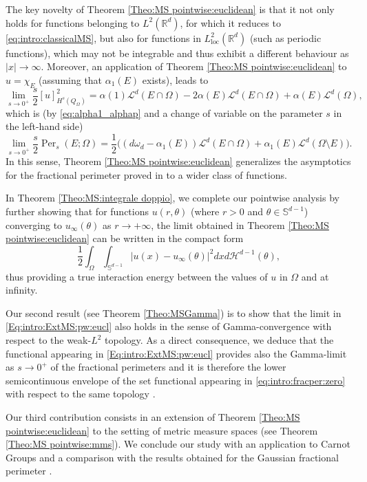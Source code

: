 \documentclass[reqno,11pt]{amsart}
\numberwithin{equation}{section}
\theoremstyle{definition} %
\theoremstyle{plain}
\theoremstyle{definition}
\theoremstyle{remark}
\def\elle#1{L^{#1}}
\def\Sd{{\mathbb{S}^{d-1}}}
\def\Haus{{\mathcal{H}^{d-1}}}
\def\Qom{{Q_\Omega}}
\def\O{\Omega}
\def\io{\int_\Omega}
\def\L{\mathcal{L}}
\def\R{\mathbb{R}}
\newcommand{\abs}[1]{\left|#1\right|}
\begin{document}
{The key novelty of Theorem \ref{Theo:MS pointwise:euclidean} is that it not only holds for functions belonging to $\elle2(\R^d)$, for which it reduces to \eqref{eq:intro:classicalMS}, but also for functions in $\elle2_{\textrm{loc}}(\R^d)$ (such as periodic functions), which may not be integrable and thus exhibit a different behaviour as $|x|\to \infty$. 
Moreover, an application of Theorem \ref{Theo:MS pointwise:euclidean} to $u=\chi_E$ (assuming that $\alpha_1(E)$ exists), leads to
\[
\lim_{s\to 0^+}\frac{s}{2}[u]^2_{H^s(\Qom)}=\alpha(1)\L^d(E\cap\O)-2\alpha(E)\L^d(E\cap\O)+\alpha(E)\L^d(\O),
\]
which is (by \eqref{eq:alpha1_alphap} and a change of variable on the parameter $s$ in the left-hand side)
\begin{equation}
    \label{eq:intro:fracper:zero}
    \lim_{s\to 0^+}\frac s2\operatorname{Per}_s(E;\Omega)=\frac12\bigg((d\omega_d-\alpha_1(E))\L^d(E\cap\O)+\alpha_1(E)\L^d(\O\setminus E)\bigg).
\end{equation}
In this sense, Theorem \ref{Theo:MS pointwise:euclidean} generalizes the asymptotics for the fractional perimeter proved in \cite[Theorem 2.5]{Quartet} to a wider class of functions.\par In Theorem \ref{Theo:MS:integrale doppio}, we complete our pointwise analysis by further showing that for functions $u(r,\theta)$ (where $r>0$ and $\theta\in\Sd$) converging to $u_\infty(\theta)$ as $r\to+\infty$, the limit obtained in Theorem \ref{Theo:MS pointwise:euclidean} can be written in the compact form
\[
\frac12\io\int_\Sd\abs{u(x)-u_\infty(\theta)}^2dxd\Haus(\theta),
\]
thus providing a true interaction energy between the values of $u$ in $\O$ and at infinity.\\


\par
Our second result (see Theorem \ref{Theo:MSGamma}) is to show that the limit in \eqref{Eq:intro:ExtMS:pw:eucl} also holds in the sense of Gamma-convergence with respect to the weak-$L^2$ topology. As a direct consequence, we deduce that the functional appearing in \eqref{Eq:intro:ExtMS:pw:eucl} provides also the Gamma-limit as $s\to0^+$ of the fractional perimeters and it is therefore the lower semicontinuous envelope of the set functional appearing in \eqref{eq:intro:fracper:zero} with respect to the same topology .\par

Our third contribution consists in an extension of Theorem \ref{Theo:MS pointwise:euclidean} to the setting of metric measure spaces (see Theorem \ref{Theo:MS pointwise:mms}). We conclude our study with an application to Carnot Groups and a comparison with the results obtained for the Gaussian fractional perimeter \cite{GaussianFracPer}.\\
}
\end{document}
